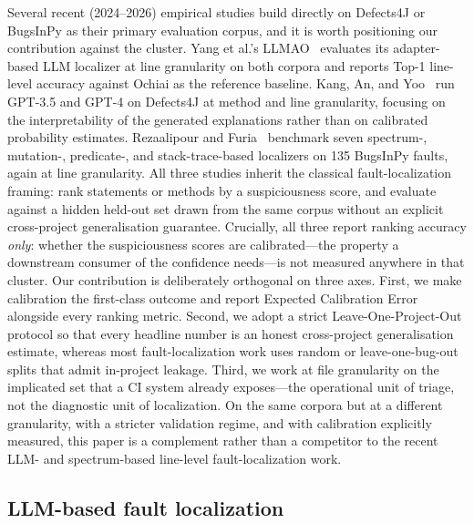 \documentclass[preprint,12pt]{elsarticle}
\begin{document}
Several recent (2024--2026) empirical studies build directly on Defects4J or BugsInPy as their primary evaluation corpus, and it is worth positioning our contribution against the cluster. Yang et al.'s LLMAO~\cite{yang2024llmao} evaluates its adapter-based LLM localizer at line granularity on both corpora and reports Top-1 line-level accuracy against Ochiai as the reference baseline. Kang, An, and Yoo~\cite{kang2024llmfl} run GPT-3.5 and GPT-4 on Defects4J at method and line granularity, focusing on the interpretability of the generated explanations rather than on calibrated probability estimates. Rezaalipour and Furia~\cite{rezaalipour2024pyfl} benchmark seven spectrum-, mutation-, predicate-, and stack-trace-based localizers on 135 BugsInPy faults, again at line granularity. All three studies inherit the classical fault-localization framing: rank statements or methods by a suspiciousness score, and evaluate against a hidden held-out set drawn from the same corpus without an explicit cross-project generalisation guarantee. Crucially, all three report ranking accuracy \emph{only}: whether the suspiciousness scores are calibrated---the property a downstream consumer of the confidence needs---is not measured anywhere in that cluster. Our contribution is deliberately orthogonal on three axes. First, we make calibration the first-class outcome and report Expected Calibration Error alongside every ranking metric. Second, we adopt a strict Leave-One-Project-Out protocol so that every headline number is an honest cross-project generalisation estimate, whereas most fault-localization work uses random or leave-one-bug-out splits that admit in-project leakage. Third, we work at file granularity on the implicated set that a CI system already exposes---the operational unit of triage, not the diagnostic unit of localization. On the same corpora but at a different granularity, with a stricter validation regime, and with calibration explicitly measured, this paper is a complement rather than a competitor to the recent LLM- and spectrum-based line-level fault-localization work.

\subsection{LLM-based fault localization}
\end{document}
